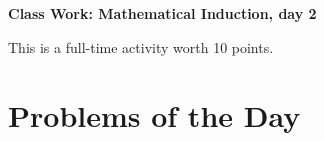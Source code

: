 \documentclass[11pt]{article}
\begin{document}
	
	\thispagestyle{empty}
	\renewcommand{\headrulewidth}{0.0pt}
	\thispagestyle{fancy}
	\lfoot{}
	\cfoot{}
	\rfoot{}	
	
	\vspace*{0in}

		\begin{center}
			\begin{large}
			\textbf{Class Work: Mathematical Induction, day 2} \\
			\end{large}
			This is a full-time activity worth 10 points. 
			
		\end{center}
		

\section*{Problems of the Day}
\end{document}
